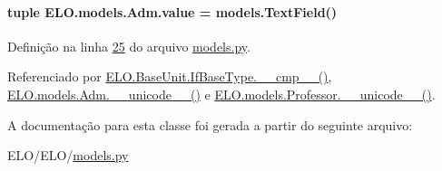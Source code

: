 \hypertarget{classELO_1_1models_1_1Adm_a98f249c493fbcbcd347297437a098212}{
\paragraph[{value}]{\setlength{\rightskip}{0pt plus 5cm}tuple E\-L\-O.\-models.\-Adm.\-value = models.\-Text\-Field()\hspace{0.3cm}{\ttfamily [static]}}}\label{classELO_1_1models_1_1Adm_a98f249c493fbcbcd347297437a098212}


Definição na linha \hyperlink{ELO_2models_8py_source_l00025}{25} do arquivo \hyperlink{ELO_2models_8py_source}{models.\-py}.



Referenciado por \hyperlink{classELO_1_1BaseUnit_1_1IfBaseType_a69c338f6f1574bd3524e9d59ebc17a7c}{E\-L\-O.\-Base\-Unit.\-If\-Base\-Type.\-\_\-\-\_\-cmp\-\_\-\-\_\-()}, \hyperlink{classELO_1_1models_1_1Adm_a3541c3ae12b8d2da3f44ac6be00a23e6}{E\-L\-O.\-models.\-Adm.\-\_\-\-\_\-unicode\-\_\-\-\_\-()} e \hyperlink{classELO_1_1models_1_1Professor_aefc9d63d429e19ec3487a7879879f29d}{E\-L\-O.\-models.\-Professor.\-\_\-\-\_\-unicode\-\_\-\-\_\-()}.



A documentação para esta classe foi gerada a partir do seguinte arquivo\-:\begin{DoxyCompactItemize}
\item 
E\-L\-O/\-E\-L\-O/\hyperlink{ELO_2models_8py}{models.\-py}\end{DoxyCompactItemize}
